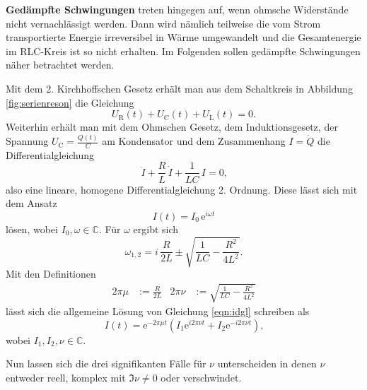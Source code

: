\textbf{Gedämpfte Schwingungen} treten hingegen auf, wenn ohmsche Widerstände nicht vernachlässigt werden.
Dann wird nämlich teilweise die vom Strom transportierte Energie irreversibel in Wärme
umgewandelt und die Gesamtenergie im RLC-Kreis ist so nicht erhalten. Im Folgenden sollen gedämpfte
Schwingungen näher betrachtet werden.

Mit dem 2. Kirchhoffschen Gesetz erhält man aus dem Schaltkreis in Abbildung \ref{fig:serienreson} die Gleichung
\begin{equation*}
	U_{\text{R}}(t) + U_{\text{C}}(t) + U_{\text{L}}(t) = 0 \text{.}
\end{equation*}
Weiterhin erhält man mit dem Ohmschen Gesetz, dem Induktionsgesetz, der Spannung $U_{\text{C}} = \frac{Q(t)}{C}$ am Kondensator und dem Zusammenhang $I = \dot{Q}$ die Differentialgleichung
\begin{equation}
	\ddot{I} + \frac{R}{L} \, \dot{I} + \frac{1}{LC} \, I = 0 \text{,}
	\label{eqn:idgl}
\end{equation}
also eine lineare, homogene Differentialgleichung 2. Ordnung.
Diese lässt sich mit dem Ansatz
\begin{equation}
	I(t) = I_0 \, \mathrm{e}^{i \omega t}
\end{equation}
lösen, wobei $I_0, \omega \in \mathbb{C}$.
Für $\omega$ ergibt sich
\begin{equation}
	\omega_{1,2} = i \, \frac{R}{2L} \pm \sqrt{\frac{1}{LC} - \frac{R^2}{4L^2}} \text{.}
\end{equation}
Mit den Definitionen
\begin{align}
	2 \pi \mu &:= \frac{R}{2L} & 2 \pi \nu &:= \sqrt{\frac{1}{LC} - \frac{R^2}{4L^2}}
	\label{eqn:defis}
\end{align}
lässt sich die allgemeine Lösung von Gleichung \eqref{eqn:idgl} schreiben als
\begin{equation}
	I(t) = \mathrm{e}^{-2 \pi \mu t} (I_1 \mathrm{e}^{i 2 \pi \nu t} + I_2 \mathrm{e}^{-i 2 \pi \nu t}) \text{,}
\end{equation}
wobei $I_1, I_2, \nu \in \mathbb{C}$.

Nun lassen sich die drei signifikanten Fälle für $\nu$ unterscheiden in denen $\nu$ entweder reell, komplex mit $\Im \nu \neq 0$ oder verschwindet.

